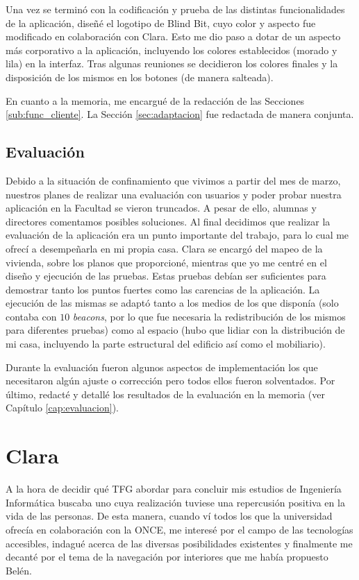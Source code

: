 Una vez se terminó con la codificación y prueba de las distintas funcionalidades de la aplicación, diseñé el logotipo de Blind Bit, cuyo color y aspecto fue modificado en colaboración con Clara. Esto me dio paso a dotar de un aspecto más corporativo a la aplicación, incluyendo los colores establecidos (morado y lila) en la interfaz. Tras algunas reuniones se decidieron los colores finales y la disposición de los mismos en los botones (de manera salteada).

En cuanto a la memoria, me encargué de la redacción de las Secciones \ref{sub:func_cliente}. La Sección \ref{sec:adaptacion} fue redactada de manera conjunta.

\subsection{Evaluación}

Debido a la situación de confinamiento que vivimos a partir del mes de marzo, nuestros planes de realizar una evaluación con usuarios y poder probar nuestra aplicación en la Facultad se vieron truncados. A pesar de ello, alumnas y directores comentamos posibles soluciones. Al final decidimos que realizar la evaluación de la aplicación era un punto importante del trabajo, para lo cual me ofrecí a desempeñarla en mi propia casa. Clara se encargó del mapeo de la vivienda, sobre los planos que proporcioné, mientras que yo me centré en el diseño y ejecución de las pruebas. Estas pruebas debían ser suficientes para demostrar tanto los puntos fuertes como las carencias de la aplicación. La ejecución de las mismas se adaptó tanto a los medios de los que disponía (solo contaba con $10$ \textit{beacons}, por lo que fue necesaria la redistribución de los mismos para diferentes pruebas) como al espacio (hubo que lidiar con la distribución de mi casa, incluyendo la parte estructural del edificio así como el mobiliario).

Durante la evaluación fueron algunos aspectos de implementación los que necesitaron algún ajuste o corrección pero todos ellos fueron solventados. Por último, redacté y detallé los resultados de la evaluación en la memoria (ver Capítulo \ref{cap:evaluacion}).


\section{Clara}
\label{sec:trabajoClara}

A la hora de decidir qué TFG abordar para concluir mis estudios de Ingeniería Informática buscaba uno cuya realización tuviese una repercusión positiva en la vida de las personas. De esta manera, cuando ví todos los que la universidad ofrecía en colaboración con la ONCE, me interesé por el campo de las tecnologías accesibles, indagué acerca de las diversas posibilidades existentes y finalmente me decanté por el tema de la navegación por interiores que me había propuesto Belén.

